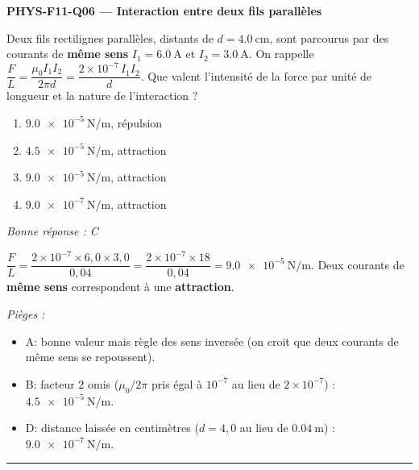 \documentclass[11pt,a4paper]{article}
\begin{document}
\noindent\textbf{PHYS-F11-Q06 --- Interaction entre deux fils parallèles}\par
Deux fils rectilignes parallèles, distants de $d=\qty{4.0}{\centi\metre}$, sont parcourus par des courants de \textbf{même sens} $I_1=\qty{6.0}{\ampere}$ et $I_2=\qty{3.0}{\ampere}$. On rappelle $\dfrac{F}{L}=\dfrac{\mu_0 I_1 I_2}{2\pi d}=\dfrac{2\times10^{-7}\,I_1 I_2}{d}$. Que valent l'intensité de la force par unité de longueur et la nature de l'interaction ?
\begin{center}
\end{center}
\begin{enumerate}[label=\Alph*)]
\item $\qty{9.0e-5}{\newton\per\metre}$, répulsion
\item $\qty{4.5e-5}{\newton\per\metre}$, attraction
\item $\qty{9.0e-5}{\newton\per\metre}$, attraction
\item $\qty{9.0e-7}{\newton\per\metre}$, attraction
\end{enumerate}
\textit{Bonne réponse : C}\par
$\dfrac{F}{L}=\dfrac{2\times10^{-7}\times6{,}0\times3{,}0}{0{,}04}=\dfrac{2\times10^{-7}\times18}{0{,}04}=\qty{9.0e-5}{\newton\per\metre}$. Deux courants de \textbf{même sens} correspondent à une \textbf{attraction}.\par
\textit{Pièges :}
\begin{itemize}
\item A: bonne valeur mais règle des sens inversée (on croit que deux courants de même sens se repoussent).
\item B: facteur $2$ omis ($\mu_0/2\pi$ pris égal à $10^{-7}$ au lieu de $2\times10^{-7}$) : $\qty{4.5e-5}{\newton\per\metre}$.
\item D: distance laissée en centimètres ($d=4{,}0$ au lieu de $\qty{0.04}{\metre}$) : $\qty{9.0e-7}{\newton\per\metre}$.
\end{itemize}
\vspace{8pt}\hrule\vspace{8pt}
\end{document}
